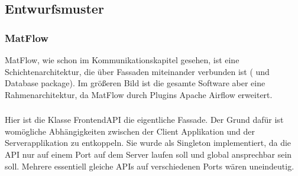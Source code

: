 \subsection{Entwurfsmuster}

\subsubsection{MatFlow}
MatFlow, wie schon im Kommunikationskapitel gesehen, ist eine Schichtenarchitektur, die über Fassaden miteinander verbunden ist
( und Database package). Im größeren Bild ist die gesamte Software aber eine Rahmenarchitektur, da MatFlow
durch Plugins Apache Airflow erweitert.

\subsubsection{}
Hier ist die Klasse FrontendAPI die eigentliche Fassade. Der Grund dafür ist womögliche Abhängigkeiten zwischen
der Client Applikation und der Serverapplikation zu entkoppeln. Sie wurde als Singleton implementiert, da die API
nur auf einem Port auf dem Server laufen soll und global ansprechbar sein soll. Mehrere essentiell gleiche APIs auf
verschiedenen Ports wären uneindeutig.


\newpage